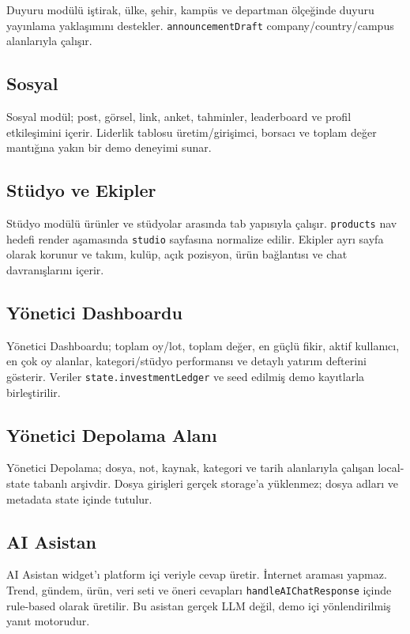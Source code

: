 \documentclass[11pt,a4paper]{article}
\newcommand{\code}[1]{\texttt{#1}}
\begin{document}
Duyuru modülü iştirak, ülke, şehir, kampüs ve departman ölçeğinde duyuru yayınlama yaklaşımını destekler. \code{announcementDraft} company/country/campus alanlarıyla çalışır.

\subsection{Sosyal}

Sosyal modül; post, görsel, link, anket, tahminler, leaderboard ve profil etkileşimini içerir. Liderlik tablosu üretim/girişimci, borsacı ve toplam değer mantığına yakın bir demo deneyimi sunar.

\subsection{Stüdyo ve Ekipler}

Stüdyo modülü ürünler ve stüdyolar arasında tab yapısıyla çalışır. \code{products} nav hedefi render aşamasında \code{studio} sayfasına normalize edilir. Ekipler ayrı sayfa olarak korunur ve takım, kulüp, açık pozisyon, ürün bağlantısı ve chat davranışlarını içerir.

\subsection{Yönetici Dashboardu}

Yönetici Dashboardu; toplam oy/lot, toplam değer, en güçlü fikir, aktif kullanıcı, en çok oy alanlar, kategori/stüdyo performansı ve detaylı yatırım defterini gösterir. Veriler \code{state.investmentLedger} ve seed edilmiş demo kayıtlarla birleştirilir.

\subsection{Yönetici Depolama Alanı}

Yönetici Depolama; dosya, not, kaynak, kategori ve tarih alanlarıyla çalışan local-state tabanlı arşivdir. Dosya girişleri gerçek storage'a yüklenmez; dosya adları ve metadata state içinde tutulur.

\subsection{AI Asistan}

AI Asistan widget'ı platform içi veriyle cevap üretir. İnternet araması yapmaz. Trend, gündem, ürün, veri seti ve öneri cevapları \code{handleAIChatResponse} içinde rule-based olarak üretilir. Bu asistan gerçek LLM değil, demo içi yönlendirilmiş yanıt motorudur.
\end{document}
